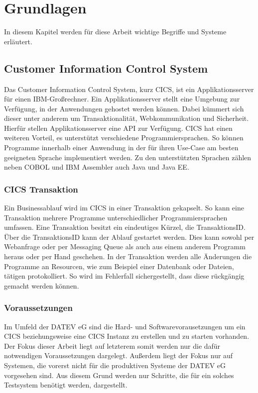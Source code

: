 \chapter{Grundlagen}\label{ch:grundlagen}
In diesem Kapitel werden für diese Arbeit wichtige Begriffe und Systeme erläutert.

\section{Customer Information Control System}\label{cics}
Das Customer Information Control System, kurz CICS, ist ein Applikationsserver für einen IBM-Großrechner.
Ein Applikationsserver stellt eine Umgebung zur Verfügung, in der Anwendungen gehostet werden können.
Dabei kümmert sich dieser unter anderem um Transaktionalität, Webkommunikation und Sicherheit.
Hierfür stellen Applikationsserver eine API zur Verfügung.
CICS hat einen weiteren Vorteil, es unterstützt verschiedene Programmiersprachen.
So können Programme innerhalb einer Anwendung in der für ihren Use-Case am besten geeigneten Sprache implementiert werden.
Zu den unterstützten Sprachen zählen neben COBOL und IBM Assembler auch Java und Java EE.
\cite{Rayns.2011}

\subsection{CICS Transaktion}\label{subsec:trans}
Ein Businessablauf wird im CICS in einer Transaktion gekapselt.
So kann eine Transaktion mehrere Programme unterschiedlicher Programmiersprachen umfassen.
Eine Transaktion besitzt ein eindeutiges Kürzel, die TransaktionsID.
Über die TransaktionsID kann der Ablauf gestartet werden.
Dies kann sowohl per Webanfrage oder per Messaging Queue als auch aus einem anderem Programm heraus oder per Hand geschehen.
In der Transaktion werden alle Änderungen die Programme an Resourcen, wie zum Beispiel einer Datenbank oder Dateien, tätigen protokolliert.
So wird im Fehlerfall sichergestellt, dass diese rückgängig gemacht werden können.
 \cite{Rayns.2011}

\subsection{Voraussetzungen}\label{subsec:voraus}
Im Umfeld der DATEV eG sind die Hard- und Softwarevorausetzungen um ein CICS beziehungsweise eine CICS Instanz zu erstellen und zu starten vorhanden.
Der Fokus dieser Arbeit liegt auf letzterem somit werden nur die dafür notwendigen Voraussetzungen dargelegt.
Außerdem liegt der Fokus nur auf Systemen, die vorerst nicht für die produktiven Systeme der DATEV eG vorgesehen sind.
Aus diesem Grund werden nur Schritte, die für ein solches Testsystem benötigt werden, dargestellt.

